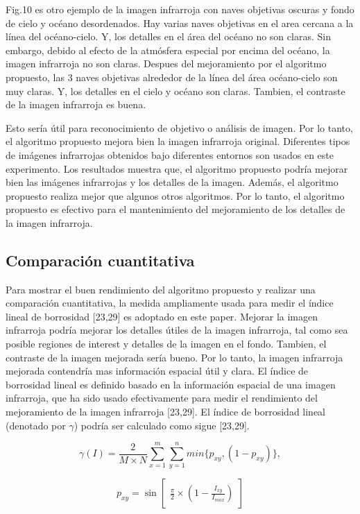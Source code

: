 \documentclass[a4paper, 11 pt, conference]{ieeeconf}      %
\begin{document}
Fig.10 es otro ejemplo de la imagen infrarroja con naves objetivas oscuras y fondo de cielo y oc\'eano desordenados. Hay varias naves objetivas en el area cercana a la l\'inea del oc\'eano-cielo. Y, los detalles en el \'area del oc\'eano no son claras. Sin embargo, debido al efecto de la atm\'osfera especial por encima del oc\'eano, la imagen infrarroja no son claras. Despues del mejoramiento por el algoritmo propuesto, las 3 naves objetivas alrededor de la l\'inea del \'area oc\'eano-cielo son muy claras. Y, los detalles en el cielo y oc\'eano son claras. Tambien, el contraste de la imagen infrarroja es buena.

Esto ser\'ia \'util para reconocimiento de objetivo o an\'alisis de imagen. Por lo tanto, el algoritmo propuesto mejora bien la imagen infrarroja original.
Diferentes tipos de im\'agenes infrarrojas obtenidos bajo diferentes entornos son usados en este experimento. Los resultados muestra que, el algoritmo propuesto podr\'ia mejorar bien las im\'agenes infrarrojas y los detalles de la imagen. Adem\'as, el algoritmo propuesto realiza mejor que algunos otros algoritmos. Por lo tanto, el algoritmo propuesto es efectivo para el mantenimiento del mejoramiento de los detalles de la imagen infrarroja.

\subsection{Comparaci\'on cuantitativa}

Para mostrar el buen rendimiento del algoritmo propuesto y realizar una comparaci\'on cuantitativa, la medida ampliamente usada para medir el \'indice lineal de borrosidad [23,29] es adoptado en este paper. Mejorar la imagen infrarroja podr\'ia mejorar los detalles \'utiles de la imagen infrarroja, tal como sea posible regiones de interest y detalles de la imagen en el fondo. Tambien, el contraste de la imagen mejorada ser\'ia bueno. Por lo tanto, la imagen infrarroja mejorada contendr\'ia mas informaci\'on espacial \'util y clara. El \'indice de borrosidad lineal es definido basado en la informaci\'on espacial de una imagen infrarroja, que ha sido usado efectivamente para medir el rendimiento del mejoramiento de la imagen infrarroja [23,29]. El \'indice de borrosidad lineal (denotado por $\gamma$) podr\'ia ser calculado como sigue [23,29].

$$
\gamma(I) = \frac{2}{M \times N}\displaystyle\sum_{x=1}^{m}\sum_{y=1}^{n}min\{p_{xy},(1-p_{xy})\},
$$

$$
p_{xy} = \sin 
 \begin{bmatrix}
    \frac{\pi}{2} \times (1 - \frac{I_{xy}}{I_{max}})
 \end{bmatrix}
$$
\end{document}
